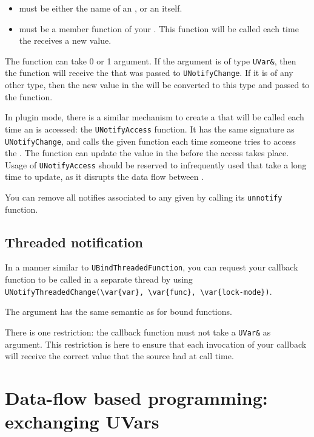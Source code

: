 \begin{itemize}
\item {} must be either the name of an \UVar, or an \UVar itself.
\item {} must be a member function of your \UObject. This function
will be called each time the \UVar receives a new value.
\end{itemize}

The function can take 0 or 1 argument. If the argument is of type
\lstinline{UVar&}, then the function will receive the \UVar that was passed to
\lstinline{UNotifyChange}. If it is of any other type, then the new value in the
\UVar will be converted to this type and passed to the function.

In plugin mode, there is a similar mechanism to create a  that will be called each time an \UVar is accessed: the
\lstinline{UNotifyAccess} function. It has the same signature as
\lstinline{UNotifyChange}, and calls the given function each time someone
tries to access the \UVar. The function can update the value in the \UVar
before the access takes place. Usage of \lstinline{UNotifyAccess} should be
reserved to infrequently used \UVar that take a long time to update, as it
disrupts the data flow between \UObject.


You can remove all notifies associated to any given \UVar by calling its
\lstinline{unnotify} function.

\subsection{Threaded notification}

In a manner similar to \lstinline{UBindThreadedFunction}, you can request
your callback function to be called in a separate thread by using
\lstinline|UNotifyThreadedChange(\var{var}, \var{func}, \var{lock-mode})|.

The  argument has the same semantic as for bound functions.

There is one restriction: the callback function must not take a
\lstinline{UVar&} as argument. This restriction is here to ensure that each
invocation of your callback will receive the correct value that the source
\UVar had at call time.

\section{Data-flow based programming: exchanging UVars}

